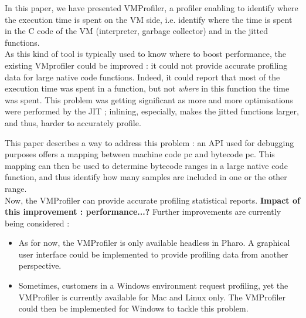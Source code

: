 \documentclass[10pt,preprint,nonatbib]{sigplanconf}
\newcommand{\myparagraph}[1]{\vspace{0.1cm}\noindent \textbf{\textit{#1.}}}
\begin{document}
In this paper, we have presented VMProfiler, a profiler enabling to identify where the execution time is spent on the VM side, i.e. identify where the time is spent in the C code of the VM (interpreter, garbage collector) and in the jitted functions.\\

As this kind of tool is typically used to know where to boost performance, the existing VMprofiler could be improved : it could not provide accurate profiling data for large native code functions. Indeed, it could report that most of the execution time was spent in a function, but not \textit{where} in this function the time was spent.
This problem was getting significant as more and more optimisations were performed by the JIT ; inlining, especially, makes the jitted functions larger, and thus, harder to accurately profile.

This paper describes a way to address this problem : an API used for debugging purposes offers a mapping between machine code pc and bytecode pc. This mapping can then be used to determine bytecode ranges in a large native code function, and thus identify how many samples are included in one or the other range.\\

Now, the VMProfiler can provide accurate profiling statistical reports.
\textbf{Impact of this improvement : performance...?}
Further improvements are currently being considered : 
\begin{itemize}
	\item As for now, the VMProfiler is only available headless in Pharo. A graphical user interface could be implemented to provide profiling data from another perspective.
	\item Sometimes, customers in a Windows environment request profiling, yet the VMProfiler is currently available for Mac and Linux only. The VMProfiler could then be implemented for Windows to tackle this problem.
\end{itemize}





%


\end{document}
